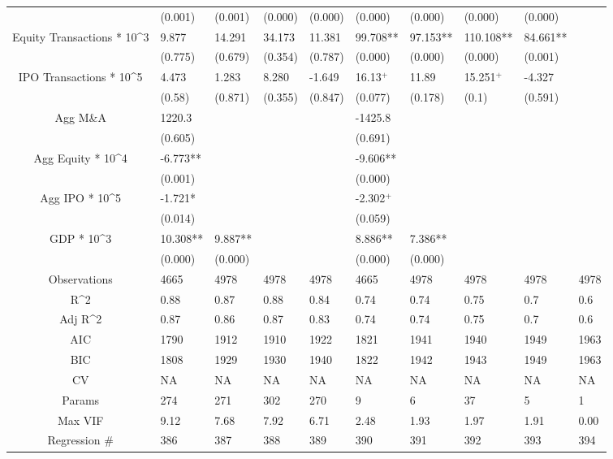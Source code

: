 \documentclass{article}
\begin{document}
\begin{table}[H]
\begin{tabular}{|clllllllll|}
   & (0.001) & (0.001) & (0.000) & (0.000) & (0.000) & (0.000) & (0.000) & (0.000) &  \\
  Equity Transactions * 10^3 & 9.877 & 14.291 & 34.173 & 11.381 & 99.708** & 97.153** & 110.108** & 84.661** &  \\
   & (0.775) & (0.679) & (0.354) & (0.787) & (0.000) & (0.000) & (0.000) & (0.001) &  \\
  IPO Transactions * 10^5 & 4.473 & 1.283 & 8.280 & -1.649 & 16.13$^{+}$ & 11.89 & 15.251$^{+}$ & -4.327 &  \\
   & (0.58) & (0.871) & (0.355) & (0.847) & (0.077) & (0.178) & (0.1) & (0.591) &  \\
  Agg M\&A & 1220.3 &  &  &  & -1425.8 &  &  &  &  \\
   & (0.605) &  &  &  & (0.691) &  &  &  &  \\
  Agg Equity * 10^4 & -6.773** &  &  &  & -9.606** &  &  &  &  \\
   & (0.001) &  &  &  & (0.000) &  &  &  &  \\
  Agg IPO * 10^5 & -1.721* &  &  &  & -2.302$^{+}$ &  &  &  &  \\
   & (0.014) &  &  &  & (0.059) &  &  &  &  \\
  GDP * 10^3 & 10.308** & 9.887** &  &  & 8.886** & 7.386** &  &  &  \\
   & (0.000) & (0.000) &  &  & (0.000) & (0.000) &  &  &  \\
  \hline
 Observations & 4665 & 4978 & 4978 & 4978 & 4665 & 4978 & 4978 & 4978 & 4978 \\
  R^2 & 0.88 & 0.87 & 0.88 & 0.84 & 0.74 & 0.74 & 0.75 & 0.7 & 0.6 \\
  Adj R^2 & 0.87 & 0.86 & 0.87 & 0.83 & 0.74 & 0.74 & 0.75 & 0.7 & 0.6 \\
  AIC & 1790 & 1912 & 1910 & 1922 & 1821 & 1941 & 1940 & 1949 & 1963 \\
  BIC & 1808 & 1929 & 1930 & 1940 & 1822 & 1942 & 1943 & 1949 & 1963 \\
  CV & NA & NA & NA & NA & NA & NA & NA & NA & NA \\
  Params & 274 & 271 & 302 & 270 & 9 & 6 & 37 & 5 & 1 \\
  Max VIF & 9.12 & 7.68 & 7.92 & 6.71 & 2.48 & 1.93 & 1.97 & 1.91 & 0.00 \\
  Regression \# & 386 & 387 & 388 & 389 & 390 & 391 & 392 & 393 & 394 \\
   \hline
\end{tabular}

\end{table}
\end{document}
